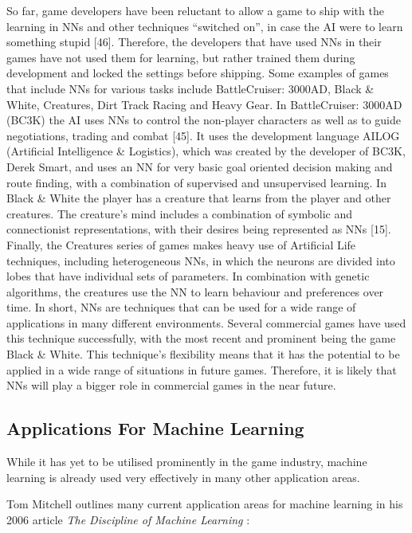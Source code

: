 \documentclass[a4paper,oneside]{report}
\begin{document}
So far, game developers have been reluctant to allow a game to ship with the learning in NNs and other techniques “switched on”, in case the AI were to learn something stupid [46]. Therefore, the developers that have used NNs in their games have not used them for learning, but rather trained them during development and locked the settings before shipping. Some examples of games that include NNs for various tasks include BattleCruiser: 3000AD, Black \& White, Creatures, Dirt Track Racing and Heavy Gear.
In BattleCruiser: 3000AD (BC3K) the AI uses NNs to control the non-player characters as well as to guide negotiations, trading and combat [45]. It uses the development language AILOG (Artificial Intelligence \& Logistics), which was created by the developer of BC3K, Derek Smart, and uses an NN for very basic goal oriented decision making and route finding, with a combination of supervised and unsupervised learning. In Black \& White the player has a creature that learns from the player and other creatures. The creature’s mind includes a combination of symbolic and connectionist representations, with their desires being represented as NNs [15]. Finally, the Creatures series of games makes heavy use of Artificial Life techniques, including heterogeneous NNs, in which the neurons are divided into lobes that have individual sets of parameters. In combination with genetic algorithms, the creatures use the NN to learn behaviour and preferences over time.
In short, NNs are techniques that can be used for a wide range of applications in many different environments. Several commercial games have used this technique successfully, with the most recent and prominent being the game Black \& White. This technique’s flexibility means that it has the potential to be applied in a wide range of situations in future games. Therefore, it is likely that NNs will play a bigger role in commercial games in the near future.

\subsection{Applications For Machine Learning}

While it has yet to be utilised prominently in the game industry, machine learning is already used very effectively in many other application areas.

Tom Mitchell outlines many current application areas for machine learning in his 2006 article \emph{The Discipline of Machine Learning} \cite{Mitchell:2006fv}:
\end{document}
